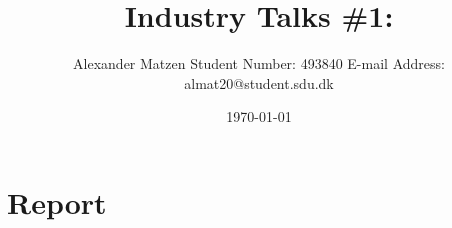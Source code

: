 \documentclass[11pt]{article}
\begin{document}
\setlength\parindent{0pt}
\setlength{\parskip}{1em}
\pagestyle{empty}

\title{Industry Talks \#1: }
\author{Alexander Matzen \addvspace{1em} Student Number: 493840 \newline E-mail Address: almat20@student.sdu.dk}
\date{\today}


\pagecolor{white}

\section*{Report}
\end{document}
